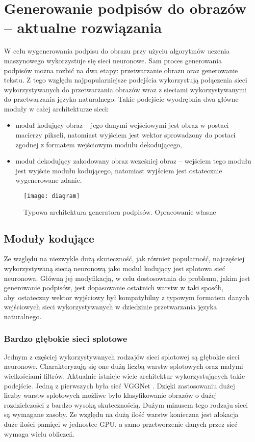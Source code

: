 \newpage %
\section{Generowanie podpisów do obrazów -- aktualne rozwiązania}
W celu wygenerowania podpisu do obrazu przy użyciu algorytmów uczenia maszynowego wykorzystuje się sieci neuronowe. Sam proces generowania podpisów można rozbić na dwa etapy: przetwarzanie obrazu oraz generowanie tekstu. Z tego względu najpopularniejsze podejścia wykorzystują połączenia sieci wykorzystywanych do przetwarzania obrazów wraz z sieciami wykorzystywanymi do przetwarzania języka naturalnego. Takie podejście wyodrębnia dwa główne moduły w całej architekturze sieci:
\begin{itemize}
    \item moduł kodujący obraz -- jego danymi wejściowymi jest obraz w postaci macierzy pikseli, natomiast wyjściem jest wektor sprowadzony do postaci zgodnej z formatem wejściowym modułu dekodującego,
    \item moduł dekodujący zakodowany obraz wcześniej obraz -- wejściem tego modułu jest wyjście modułu kodującego, natomiast wyjściem jest ostatecznie wygenerowane zdanie.
\end{itemize}
\begin{figure}[H]
  \centering
  \texttt{[image: diagram]}
  \caption{Typowa architektura generatora podpisów. Opracowanie własne}
  \label{fig:schemat-captioning}
\end{figure}
\subsection{Moduły kodujące}
Ze względu na niezwykle dużą skuteczność, jak również popularność, najczęściej wykorzystywaną siecią neuronową jako moduł kodujący jest splotowa sieć neuronowa. Główną jej modyfikacją, w celu dostosowania do problemu, jakim jest generowanie podpisów, jest dopasowanie ostatnich warstw w taki sposób, aby~ostateczny wektor wyjściowy był kompatybilny z typowym formatem danych wejściowych sieci wykorzystywanych w dziedzinie przetwarzania języka naturalnego.
\subsubsection{Bardzo głębokie sieci splotowe}
Jednym z częściej wykorzystywanych rodzajów sieci splotowej są głębokie sieci neuronowe. Charakteryzują się one dużą liczbą warstw splotowych oraz małymi wielkościami filtrów. Aktualnie istnieje wiele architektur wykorzystujących takie podejście. Jedną z pierwszych była sieć VGGNet \cite{vggnet}. Dzięki zastosowaniu dużej liczby warstw splotowych możliwe było klasyfikowanie obrazów o dużej rozdzielczości z bardzo wysoką skutecznością. Dużym minusem tego rodzaju sieci są wymagane zasoby. Ze względu na dużą ilość warstw konieczna jest alokacja duże ilości pamięci w jednostce GPU, a samo przetworzenie danych przez sieć wymaga wielu obliczeń.
